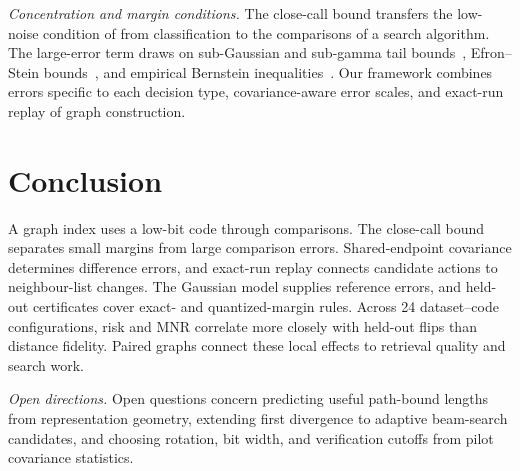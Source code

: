 \documentclass[twoside,11pt]{article}
\begin{document}
\noindent\emph{Concentration and margin conditions.}\quad
The close-call bound transfers the low-noise condition of \citet{tsybakov2004optimal} from classification to the comparisons of a search algorithm. The large-error term draws on sub-Gaussian and sub-gamma tail bounds~\citep{vershynin2018high,boucheron2013concentration}, Efron--Stein bounds~\citep{efron1981jackknife}, and empirical Bernstein inequalities~\citep{maurer2009empirical}. Our framework combines errors specific to each decision type, covariance-aware error scales, and exact-run replay of graph construction.

\section{Conclusion}
\label{sec:conclusion}

A graph index uses a low-bit code through comparisons. The close-call bound separates small margins from large comparison errors. Shared-endpoint covariance determines difference errors, and exact-run replay connects candidate actions to neighbour-list changes. The Gaussian model supplies reference errors, and held-out certificates cover exact- and quantized-margin rules. Across 24 dataset--code configurations, risk and MNR correlate more closely with held-out flips than distance fidelity. Paired graphs connect these local effects to retrieval quality and search work.

\noindent\emph{Open directions.}\quad
Open questions concern predicting useful path-bound lengths from representation geometry, extending first divergence to adaptive beam-search candidates, and choosing rotation, bit width, and verification cutoffs from pilot covariance statistics.


\FloatBarrier
\appendix



\FloatBarrier

\end{document}

